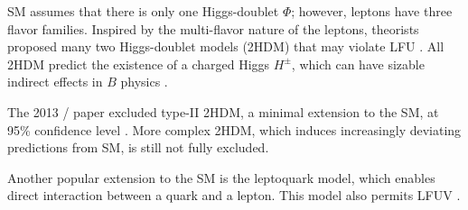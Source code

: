 SM assumes that there is only one Higgs-doublet $\Phi$; however, leptons have
three flavor families.
Inspired by the multi-flavor nature of the leptons, theorists proposed many two
Higgs-doublet models (2HDM) that may violate LFU \cite{Branco:2011iw}.
All 2HDM predict the existence of a charged Higgs $H^{\pm}$, which can have
sizable indirect effects in $B$ physics \cite{Branco:2011iw}.

The 2013 \BaBar/ paper excluded type-II 2HDM, a minimal extension to the SM, at
95\% confidence level \cite{Lees:2013uzd}.
More complex 2HDM, which induces increasingly deviating predictions from SM, is
still not fully excluded.

Another popular extension to the SM is the leptoquark model, which enables
direct interaction between a quark and a lepton.
This model also permits LFUV \cite{Faber:2018afz}.
